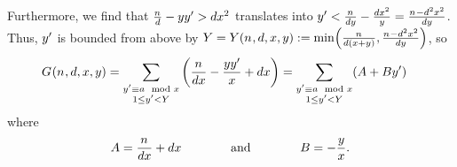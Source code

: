   Furthermore, we find that
  $\frac{n_{}}{d}-yy' > dx^2$ translates into
  $y'< \frac{n_{}}{dy}-\frac{dx^2}{y}
  =\frac{n_{}-d^2x^2}{dy}$.
  Thus, $y'$ is bounded from above by
  \(
    \UpperBound =
    \UpperBoundOf{\Size,\TheDivisor,\LeftA,\RightA}
    :=
    \MinOf{
      \frac{\Size}{\TheDivisor\Parens{\LeftA+\RightA}},
      \frac{\Size-\TheDivisor^2\LeftA^2}{\TheDivisor\RightA}
    }
  \), so
  \begin{align*}
    \TheQuantityOf{\Size,\TheDivisor,\LeftA,\RightA}
    &=
    \Sum[\substack{
      \RightB \congruent \TheCongruenceClass \mod \LeftA \\
      1 \leq \RightB < \UpperBound
    }]{
    \Parens{
    \frac{\Size}{\TheDivisor\LeftA}
    -
    \frac{\RightA\RightB}{\LeftA}+\TheDivisor\LeftA
    }
    }
    =
    \Sum[\substack{
      \RightB \congruent \TheCongruenceClass \mod \LeftA \\
      1 \leq \RightB < \UpperBound
    }]{
      (\ConstantTerm+\LinearTerm\RightB)
    }
  \end{align*}
  where
  \[
    A
    =  \frac{n_{}}{dx} +dx
    \qquad\qquad\text{and}\qquad\qquad                   
    B
    = -\frac{y}{x}
    .
  \]

